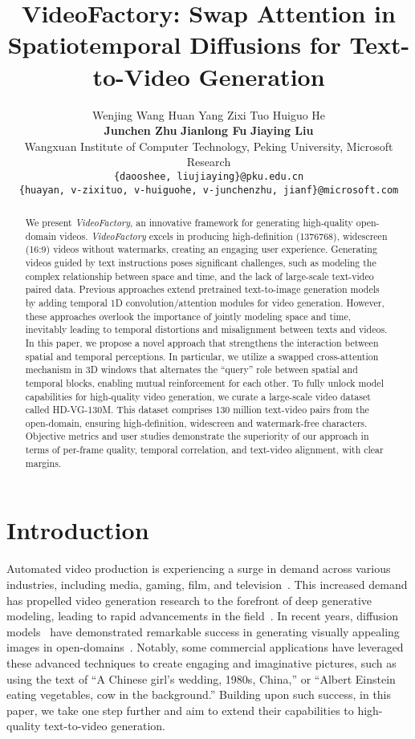 \documentclass{article}
\title{VideoFactory: Swap Attention in Spatiotemporal Diffusions for Text-to-Video Generation}
\author{
Wenjing Wang \quad Huan Yang \quad Zixi Tuo \quad Huiguo He \\ \textbf{Junchen Zhu} \quad \textbf{Jianlong Fu} \quad \textbf{Jiaying Liu} \\
Wangxuan Institute of Computer Technology, Peking University, Microsoft Research\\
\texttt{\{daooshee, liujiaying\}@pku.edu.cn}\\
\texttt{\{huayan, v-zixituo, v-huiguohe, v-junchenzhu, jianf\}@microsoft.com}\\
}
\begin{document}
\maketitle

\begin{abstract}
We present \textit{VideoFactory}, an innovative framework for generating high-quality open-domain videos.
\textit{VideoFactory} excels in producing high-definition (1376768), widescreen (16:9) videos without watermarks, creating an engaging user experience.
Generating videos guided by text instructions poses significant challenges, such as modeling the complex relationship between space and time, and the lack of large-scale text-video paired data. Previous approaches extend pretrained text-to-image generation models by adding temporal 1D convolution/attention modules for video generation.
However, these approaches overlook the importance of jointly modeling space and time, inevitably leading to temporal distortions and misalignment between texts and videos. In this paper, we propose a novel approach that strengthens the interaction between spatial and temporal perceptions. In particular, we utilize a swapped cross-attention mechanism in 3D windows that alternates the ``query'' role between spatial and temporal blocks, enabling mutual reinforcement for each other. 
To fully unlock model capabilities for high-quality video generation, we curate a large-scale video dataset called HD-VG-130M. This dataset comprises 130 million text-video pairs from the open-domain, ensuring high-definition, widescreen and watermark-free characters.
Objective metrics and user studies demonstrate the superiority of our approach in terms of per-frame quality, temporal correlation, and text-video alignment, with clear margins. 
\end{abstract}

\section{Introduction}
\label{sec:introduction}

Automated video production is experiencing a surge in demand across various industries, including media, gaming, film, and television~\cite{2017_DigiPro,2021_Playable}. This increased demand has propelled video generation research to the forefront of deep generative modeling, leading to rapid advancements in the field~\cite{2022_VDM, 2016_VG_ICLR, 2017TGAN,2018MoCoGAN, 2016_VG_NIPS}. In recent years, diffusion models~\cite{2020DDPM} have demonstrated remarkable success in generating visually appealing images in open-domains~\cite{2022LDM,imagen}. Notably, some commercial applications have leveraged these advanced techniques to create engaging and imaginative pictures, such as using the text of ``A Chinese girl's wedding, 1980s, China,'' or ``Albert Einstein eating vegetables, cow in the background.'' 
Building upon such success, in this paper, we take one step further and aim to extend their capabilities to high-quality text-to-video generation.
\end{document}
